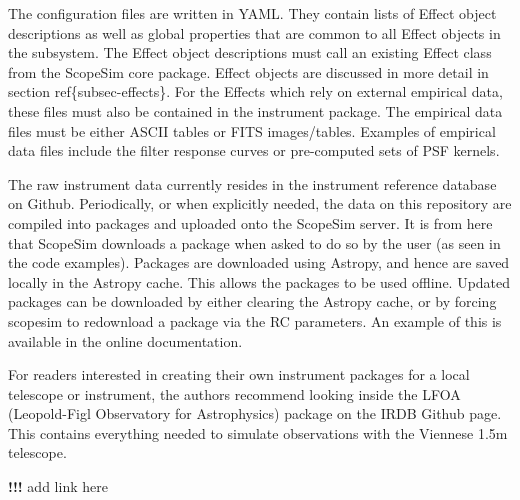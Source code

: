 The configuration files are written in YAML.
They contain lists of Effect object descriptions as well as global properties that are common to all Effect objects in the subsystem.
The Effect object descriptions must call an existing Effect class from the ScopeSim core package.
Effect objects are discussed in more detail in section ref\{subsec-effects\}.
For the Effects which rely on external empirical data, these files must also be contained in the instrument package.
The empirical data files must be either ASCII tables or FITS images/tables.
Examples of empirical data files include the filter response curves or pre-computed sets of PSF kernels.

The raw instrument data currently resides in the instrument reference database on Github.
Periodically, or when explicitly needed, the data on this repository are compiled into packages and uploaded onto the ScopeSim server.
It is from here that ScopeSim downloads a package when asked to do so by the user (as seen in the code examples).
Packages are downloaded using Astropy, and hence are saved locally in the Astropy cache.
This allows the packages to be used offline.
Updated packages can be downloaded by either clearing the Astropy cache, or by forcing scopesim to redownload a package via the RC parameters.
An example of this is available in the online documentation.

For readers interested in creating their own instrument packages for a local telescope or instrument, the authors recommend looking inside the LFOA (Leopold-Figl Observatory for Astrophysics) package on the IRDB Github page.
This contains everything needed to simulate observations with the Viennese 1.5m telescope.

\textbf{!!!} add link here
